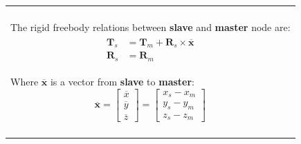 \documentclass[10pt,b5paper,titlepage]{book}
\newcommand{\m}{\mathbf}
\newenvironment{bbox}[1][0.96]
{
    \begin{center}
        \begin{tabular}{|p{#1\textwidth}|}
            \hline\\
}
{
            \\\\\hline
        \end{tabular}
    \end{center}
}
\newenvironment{eqarray}
{
    \begin{eqnarray}
        \begin{aligned}
}
{
        \end{aligned}
    \end{eqnarray}
}
\begin{document}
\begin{bbox}[0.95]
    The rigid freebody relations between \textbf{slave} and \textbf{master} node are:
    \begin{eqarray}
        \m{T}_s &= \m{T}_m + \m{R}_s \times \overline{\m{x}} \\
        \m{R}_s &= \m{R}_m
    \end{eqarray}

    Where $ \overline{\m{x}} $ is a vector from \textbf{slave} to \textbf{master}:
    \begin{equation}
        \overline{\m{x}} =
        \begin{bmatrix}
            \overline{x} \\
            \overline{y} \\
            \overline{z}
        \end{bmatrix} =
        \begin{bmatrix}
            x_s - x_m \\
            y_s - y_m \\
            z_s - z_m
        \end{bmatrix}
    \end{equation}


\end{bbox}
\end{document}
